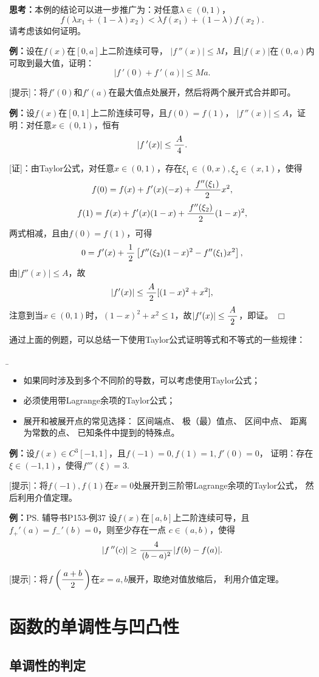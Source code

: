 {\bf 思考：}本例的结论可以进一步推广为：对任意$\lambda\in(0,1)$，
$$f(\lambda x_1+(1-\lambda)x_2)<\lambda
f(x_1)+(1-\lambda)f(x_2).$$
请考虑该如何证明。

{\bf 例：}设在$f(x)$在$[0,a]$上二阶连续可导，
$|f\,''(x)|\leq M$，且$|f(x)|$在$(0,a)$内可取到最大值，证明：
$$|f\,'(0)+f\,'(a)|\leq Ma.$$

[提示]：将$f'(0)$和$f'(a)$在最大值点处展开，然后将两个展开式合并即可。

{\bf 例：}设$f(x)$在$[0,1]$上二阶连续可导，且$f(0)=f(1)$，
$|f\,''(x)|\leq A$，证明：对任意$x\in(0,1)$，恒有
$$|f\,'(x)|\leq\displaystyle\frac{\,{A}\,}{\,{4}\,}.$$

[证]：由Taylor公式，对任意$x\in(0,1)$，存在$\xi_1\in(0,x),
\xi_2\in(x,1)$，使得
$$f(0)=f(x)+f'(x)(-x)+\displaystyle\frac{\,{f''(\xi_1)}\,}{\,{2}\,}x^2,$$
$$f(1)=f(x)+f'(x)(1-x)+\displaystyle\frac{\,{f''(\xi_2)}\,}{\,{2}\,}(1-x)^2,$$
两式相减，且由$f(0)=f(1)$，可得
$$0=f'(x)+\displaystyle\frac{\,{1}\,}{\,{2}\,}\left[f''(\xi_2)(1-x)^2-f''(\xi_1)x^2\right],$$
由$|f''(x)|\leq A$，故
$$|f'(x)|\leq\displaystyle\frac{\,{A}\,}{\,{2}\,}[(1-x)^2+x^2],$$
注意到当$x\in(0,1)$时，$(1-x)^2+x^2\leq1$，故$|f'(x)|\leq\displaystyle\frac{\,{A}\,}{\,{2}\,}$，即证。
\hfill$\Box$

通过上面的例题，可以总结一下使用Taylor公式证明等式和不等式的一些规律：
{\b
\begin{itemize}
  \item 如果同时涉及到多个不同阶的导数，可以考虑使用Taylor公式；
  \item 必须使用带Lagrange余项的Taylor公式；
  \item 展开和被展开点的常见选择： 区间端点、 极（最）值点、
  区间中点、 距离为常数的点、 已知条件中提到的特殊点。
\end{itemize}
}

{\bf 例：}设$f(x)\in C^3[-1,1]$，且$f(-1)=0,f(1)=1,f'(0)=0$，
证明：存在$\xi\in(-1,1)$，使得$f'''(\xi)=3$.

[提示]：将$f(-1),f(1)$在$x=0$处展开到三阶带Lagrange余项的Taylor公式，
然后利用介值定理。

{\bf 例：}\ps{辅导书P153-例37}
设$f(x)$在$[a,b]$上二阶连续可导，且$f_+'(a)=f_-'(b)=0$，则至少存在一点
$c\in(a,b)$，使得
$$|f\,''(c)|\geq \displaystyle\frac{\,{4}\,}{\,{(b-a)^2}\,}|f(b)-f(a)|.$$

[提示]：将$f\left(\displaystyle\frac{\,{a+b}\,}{\,{2}\,}\right)$在$x=a,b$展开，取绝对值放缩后，
利用介值定理。

\section{函数的单调性与凹凸性}

\subsection{单调性的判定}

